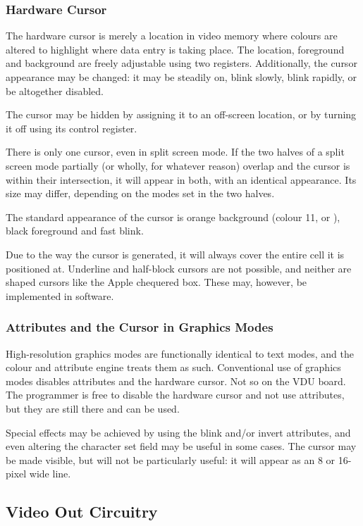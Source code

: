\subsubsection{Hardware Cursor}
\label{sec:vdu:cursor}

The hardware cursor is merely a location in video memory where colours are
altered to highlight where data entry is taking place. The location, foreground
and background are freely adjustable using two registers. Additionally, the
cursor appearance may be changed: it may be steadily on, blink slowly, blink
rapidly, or be altogether disabled.

The cursor may be hidden by assigning it to an off-screen location, or by
turning it off using its control register.

There is only one cursor, even in split screen mode. If the two halves of a
split screen mode partially (or wholly, for whatever reason) overlap and the
cursor is within their intersection, it will appear in both, with an identical
appearance. Its size may differ, depending on the modes set in the two halves.

The standard appearance of the cursor is orange background (colour 11, or
), black foreground and fast blink.

Due to the way the cursor is generated, it will always cover the entire cell it
is positioned at. Underline and half-block cursors are not possible, and
neither are shaped cursors like the Apple chequered box. These may, however, be
implemented in software.

\subsubsection{Attributes and the Cursor in Graphics Modes}

High-resolution graphics modes are functionally identical to text modes, and
the colour and attribute engine treats them as such. Conventional use of
graphics modes disables attributes and the hardware cursor. Not so on the VDU
board. The programmer is free to disable the hardware cursor and not use
attributes, but they are still there and can be used.

Special effects may be achieved by using the blink and/or invert attributes,
and even altering the character set field may be useful in some cases. The
cursor may be made visible, but will not be particularly useful: it will appear
as an 8 or 16-pixel wide line.

\subsection{Video Out Circuitry}
\label{sec:vdu:video-out}

